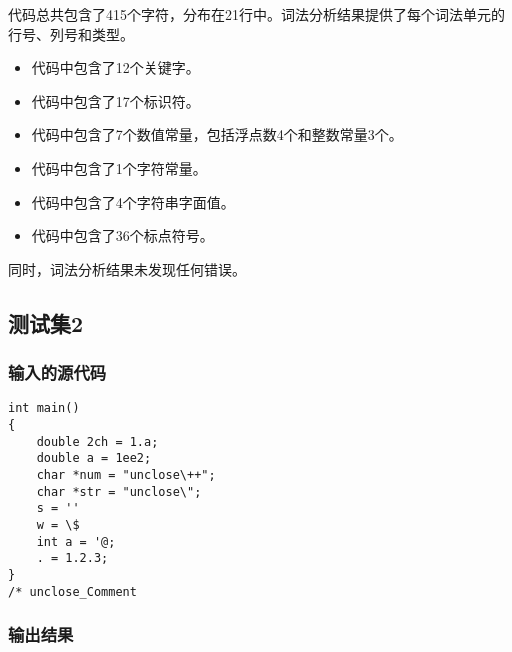 \documentclass[lang=cn,11pt,a4paper]{elegantpaper}
\begin{document}
代码总共包含了415个字符，分布在21行中。词法分析结果提供了每个词法单元的行号、列号和类型。

\begin{itemize}
    \item 代码中包含了12个关键字。
    \item 代码中包含了17个标识符。
    \item 代码中包含了7个数值常量，包括浮点数4个和整数常量3个。
    \item 代码中包含了1个字符常量。
    \item 代码中包含了4个字符串字面值。
    \item 代码中包含了36个标点符号。
\end{itemize}

同时，词法分析结果未发现任何错误。

\subsection{测试集2}

\subsubsection{输入的源代码}

\begin{lstlisting}
int main()
{
    double 2ch = 1.a;
    double a = 1ee2;
    char *num = "unclose\++";
    char *str = "unclose\";
    s = ''
    w = \$
    int a = '@;
    . = 1.2.3;
}
/* unclose_Comment

\end{lstlisting}

\subsubsection{输出结果}

\end{document}
